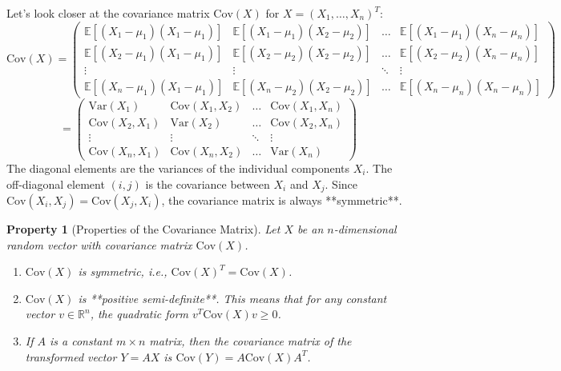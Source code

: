 \documentclass[11pt, a4paper]{article}
\newtheorem{property}[theorem]{Property}
\theoremstyle{definition} %
\newcommand{\R}{\mathbb{R}}
\newcommand{\E}{\mathbb{E}} %
\newcommand{\Var}{\mathrm{Var}} %
\newcommand{\Cov}{\mathrm{Cov}} %
\begin{document}
Let's look closer at the covariance matrix $\Cov(X)$ for $X = (X_1, \dots, X_n)^T$:
\[ \Cov(X) = \begin{pmatrix}
\E[(X_1-\mu_1)(X_1-\mu_1)] & \E[(X_1-\mu_1)(X_2-\mu_2)] & \dots & \E[(X_1-\mu_1)(X_n-\mu_n)] \\
\E[(X_2-\mu_1)(X_1-\mu_1)] & \E[(X_2-\mu_2)(X_2-\mu_2)] & \dots & \E[(X_2-\mu_2)(X_n-\mu_n)] \\
\vdots & \vdots & \ddots & \vdots \\
\E[(X_n-\mu_1)(X_1-\mu_1)] & \E[(X_n-\mu_2)(X_2-\mu_2)] & \dots & \E[(X_n-\mu_n)(X_n-\mu_n)]
\end{pmatrix} \]
\[ = \begin{pmatrix}
\Var(X_1) & \Cov(X_1, X_2) & \dots & \Cov(X_1, X_n) \\
\Cov(X_2, X_1) & \Var(X_2) & \dots & \Cov(X_2, X_n) \\
\vdots & \vdots & \ddots & \vdots \\
\Cov(X_n, X_1) & \Cov(X_n, X_2) & \dots & \Var(X_n)
\end{pmatrix} \]
The diagonal elements are the variances of the individual components $X_i$. The off-diagonal element $(i, j)$ is the covariance between $X_i$ and $X_j$. Since $\Cov(X_i, X_j) = \Cov(X_j, X_i)$, the covariance matrix is always **symmetric**.

\begin{property}[Properties of the Covariance Matrix]
Let $X$ be an $n$-dimensional random vector with covariance matrix $\Cov(X)$.
\begin{enumerate}
    \item $\Cov(X)$ is symmetric, i.e., $\Cov(X)^T = \Cov(X)$.
    \item $\Cov(X)$ is **positive semi-definite**. This means that for any constant vector $v \in \R^n$, the quadratic form $v^T \Cov(X) v \ge 0$.
    \item If $A$ is a constant $m \times n$ matrix, then the covariance matrix of the transformed vector $Y = AX$ is $\Cov(Y) = A \Cov(X) A^T$.
\end{enumerate}
\end{property}
\end{document}
